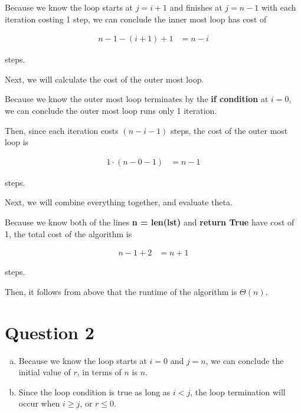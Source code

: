 \documentclass[12pt]{article}
\begin{document}
\begin{enumerate}[a.]
    Because we know the loop starts at $j = i + 1$ and finishes at $j = n-1$ with
    each iteration costing 1 step, we can conclude the inner most loop has cost of

    \setcounter{equation}{0}
    \begin{align}
        n-1-(i+1)+1 &= n-i
    \end{align}

    steps.

    \bigskip

    Next, we will calculate the cost of the outer most loop.

    \bigskip

    Because we know the outer most loop terminates by the \textbf{if condition} at
    $i = 0$, we can conclude the outer most loop runs only 1 iteration.

    \bigskip

    Then, since each iteration costs $(n-i-1)$ steps, the cost of the outer most loop is

    \begin{align}
        1 \cdot (n-0-1) &= n-1
    \end{align}

    steps.

    \bigskip

    Next, we will combine everything together, and evaluate theta.

    \bigskip

    Because we know both of the lines \textbf{n = len(lst)} and \textbf{return True} have cost of 1,
    the total cost of the algorithm is

    \begin{align}
        n - 1 + 2 &= n + 1
    \end{align}

    steps.

    \bigskip

    Then, it follows from above that the runtime of the algorithm is $\Theta(n)$.

\end{enumerate}

\section*{Question 2}
\begin{enumerate}[a.]
    \item
    Because we know the loop starts at $ i = 0$ and $j = n$, we can conclude the
    initial value of $r$, in terms of $n$ is $n$.

    \item
    Since the loop condition is true as long as $i < j$, the loop termination will
    occur when $i \geq j$, or $r \leq 0$.

\end{enumerate}
\end{document}
